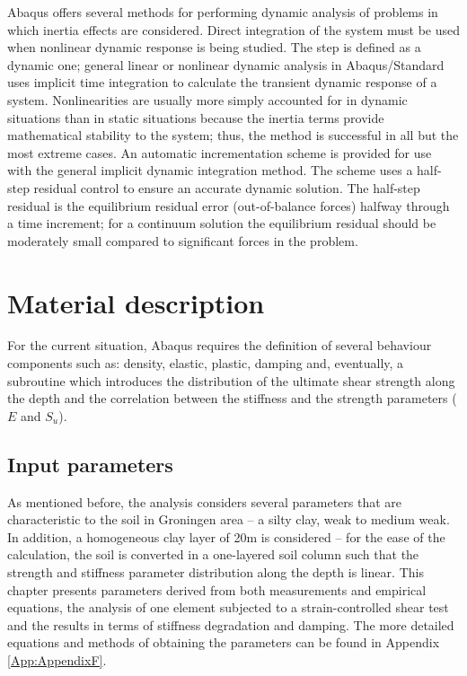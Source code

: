 \documentclass[10pt,a4paper]{report}
\begin{document}
Abaqus offers several methods for performing dynamic analysis of problems in which inertia effects are considered. Direct integration of the system must be used when nonlinear dynamic response is being studied. The step is defined as a dynamic one; general linear or nonlinear dynamic analysis in Abaqus/Standard uses implicit time integration to calculate the transient dynamic response of a system. Nonlinearities are usually more simply accounted for in dynamic situations than in static situations because the inertia terms provide mathematical stability to the system; thus, the method is successful in all but the most extreme cases. An automatic incrementation scheme is provided for use with the general implicit dynamic integration method. The scheme uses a half-step residual control to ensure an accurate dynamic solution. The half-step residual is the equilibrium residual error (out-of-balance forces) halfway through a time increment; for a continuum solution the equilibrium residual should be moderately small compared to significant forces in the problem.

\section{Material description}
For the current situation, Abaqus requires the definition of several behaviour components such as: density, elastic, plastic, damping and, eventually, a subroutine which introduces the distribution of the ultimate shear strength along the depth and the correlation between the stiffness and the strength parameters ($E$ and $S_u$).

\subsection{Input parameters}
As mentioned before, the analysis considers several parameters that are characteristic to the soil in Groningen area – a silty clay, weak to medium weak. In addition, a homogeneous clay layer of 20m is considered – for the ease of the calculation, the soil is converted in a one-layered soil column such that the strength and stiffness parameter distribution  along the depth is linear. This chapter presents parameters derived from both measurements and empirical equations, the analysis of one element subjected to a strain-controlled shear test and the results in terms of stiffness degradation and damping. The more detailed equations and methods of obtaining the parameters can be found in Appendix \ref{App:AppendixF}.	
\end{document}
